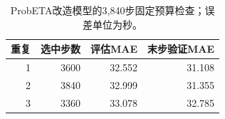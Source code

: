 \begin{table}[t]
\centering\footnotesize\setlength{\tabcolsep}{4pt}
\caption{ProbETA改造模型的3,840步固定预算检查；误差单位为秒。}\label{tab:probeta_extended}
\begin{tabular}{rrrr}\toprule
重复 & 选中步数 & 评估MAE & 末步验证MAE\\\midrule
1 & 3600 & 32.552 & 31.108\\
2 & 3840 & 32.999 & 31.355\\
3 & 3360 & 33.078 & 32.785\\
\bottomrule\end{tabular}
\end{table}
